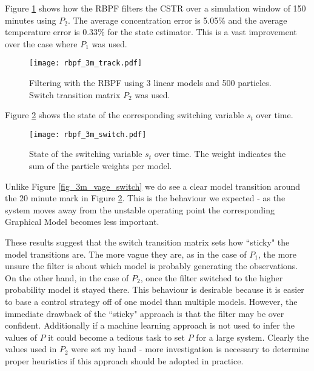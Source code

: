 Figure \ref{fig_3m_track} shows how the RBPF filters the CSTR over a simulation window of 150 minutes using $P_2$. The average concentration error is 5.05\% and the average temperature error is 0.33\% for the state estimator. This is a vast improvement over the case where $P_1$ was used.
\begin{figure}[H] 
\centering
\texttt{[image: rbpf\_3m\_track.pdf]}
\caption{Filtering with the RBPF using 3 linear models and 500 particles. Switch transition matrix $P_2$ was used.}
\label{fig_3m_track}
\end{figure}
Figure \ref{fig_3m_switch} shows the state of the corresponding switching variable $s_t$ over time.
\begin{figure}[H] 
\centering
\texttt{[image: rbpf\_3m\_switch.pdf]}
\caption{State of the switching variable $s_t$ over time. The weight indicates the sum of the particle weights per model.}
\label{fig_3m_switch}
\end{figure}
Unlike Figure \ref{fig_3m_vage_switch} we do see a clear model transition around the 20 minute mark in Figure \ref{fig_3m_switch}. This is the behaviour we expected - as the system moves away from the unstable operating point the corresponding Graphical Model becomes less important.

These results suggest that the switch transition matrix sets how ``sticky" the model transitions are. The more vague they are, as in the case of $P_1$, the more unsure the filter is about which model is probably generating the observations. On the other hand, in the case of $P_2$, once the filter switched to the higher probability model it stayed there. This behaviour is desirable because it is easier to base a control strategy off of one model than multiple models. However, the immediate drawback of the ``sticky" approach is that the filter may be over confident. Additionally if a machine learning approach is not used to infer the values of $P$ it could become a tedious task to set $P$ for a large system. Clearly the values used in $P_2$ were set my hand - more investigation is necessary to determine proper heuristics if this approach should be adopted in practice.

